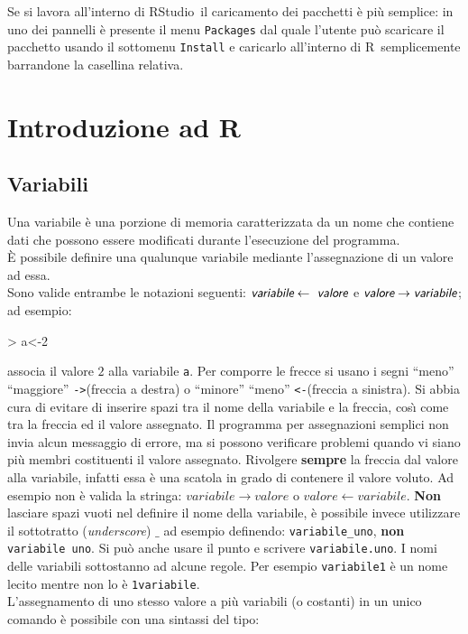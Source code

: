 \documentclass[onecolumn,11pt]{book}
\newcommand{\varia}[1]{\textsl{\textsf{#1}}}
\newcommand{\rst}{\textsf{RStudio}~}
\newcommand{\rpr}{\textsf{R}~}
\begin{document}
Se si lavora all'interno di \rst il caricamento dei pacchetti \`e pi\`u semplice: in uno dei pannelli \`e presente il menu \texttt{Packages} dal quale l'utente pu\`o scaricare il pacchetto usando il sottomenu \texttt{Install} e caricarlo all'interno di \rpr semplicemente barrandone la casellina relativa.

\chapter{Introduzione ad \rpr}

\section{Variabili}
Una variabile \`e una porzione di memoria caratterizzata da un nome che contiene dati che possono essere modificati durante l'esecuzione del programma.\\ \`E  possibile definire una qualunque variabile mediante l'assegnazione di un valore ad essa.\\
Sono valide entrambe le notazioni seguenti:
$ \varia{variabile}\leftarrow\varia{ valore}$ e
$\varia{valore} \to  \varia{variabile}$;
ad esempio:
\begin{Schunk}
\begin{Sinput}
> a<-2 
\end{Sinput}
\end{Schunk}
associa il valore $2$ alla variabile \texttt{a}. Per comporre le frecce si usano i segni ``meno'' ``maggiore''  \texttt{->}(freccia a destra) o ``minore'' ``meno''  \texttt{<-}(freccia a sinistra).
Si abbia cura di evitare di inserire spazi tra il nome della variabile e la freccia, cos\`\i \; come tra la freccia ed il valore assegnato. Il programma per assegnazioni semplici non invia  alcun messaggio di errore, ma si possono verificare problemi quando vi siano pi\`u membri costituenti il valore assegnato.
Rivolgere {\bf sempre} la freccia dal valore alla variabile, infatti essa \`e una scatola in grado di contenere il valore voluto. Ad esempio non \`e valida la stringa:
$variabile\rightarrow valore $ o $ valore\leftarrow variabile$.
{\bf Non} lasciare spazi vuoti nel definire il nome della variabile, \`e possibile invece utilizzare  il sottotratto (\textit{underscore}) $\_$  ad esempio definendo: \texttt{variabile\_uno}, {\bf non} \texttt{variabile uno}. Si pu\`o anche usare il punto e scrivere  \texttt{variabile.uno}.
I nomi delle variabili sottostanno ad alcune regole. Per esempio \texttt{variabile1} \`e un nome lecito mentre non lo \`e  \texttt{1variabile}.\\  L'assegnamento di uno stesso valore a pi\`u variabili (o costanti) in un unico comando \`e possibile con una sintassi del tipo: 
\end{document}
